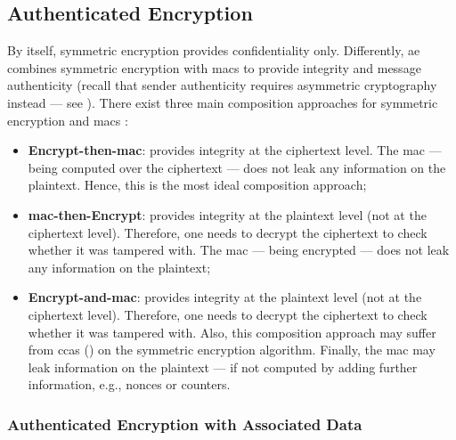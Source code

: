 \subsection{Authenticated Encryption}\label{sec:symmetric_cryptography:ae}

By itself, symmetric encryption provides confidentiality only. Differently, \gls{ae} combines symmetric encryption with \glspl{mac} to provide integrity and message authenticity (recall that sender authenticity requires asymmetric cryptography instead --- see ). There exist three main composition approaches for symmetric encryption and \glspl{mac} \cite{goos_authenticated_2000}:

\begin{itemize}
	\item \textbf{Encrypt-then-\gls{mac}}: provides integrity at the ciphertext level. The \gls{mac} --- being computed over the ciphertext --- does not leak any information on the plaintext. Hence, this is the most ideal composition approach;
	\item \textbf{\gls{mac}-then-Encrypt}: provides integrity at the plaintext level (not at the ciphertext level). Therefore, one needs to decrypt the ciphertext to check whether it was tampered with. The \gls{mac} --- being encrypted --- does not leak any information on the plaintext;
	\item \textbf{Encrypt-and-\gls{mac}}: provides integrity at the plaintext level (not at the ciphertext level). Therefore, one needs to decrypt the ciphertext to check whether it was tampered with. Also, this composition approach may suffer from \glspl{cca} () on the symmetric encryption algorithm. Finally, the \gls{mac} may leak information on the plaintext --- if not computed by adding further information, e.g., nonces or counters.
\end{itemize}

\subsubsection{Authenticated Encryption with Associated Data}\label{sec:symmetric_cryptography:ae:aead}

